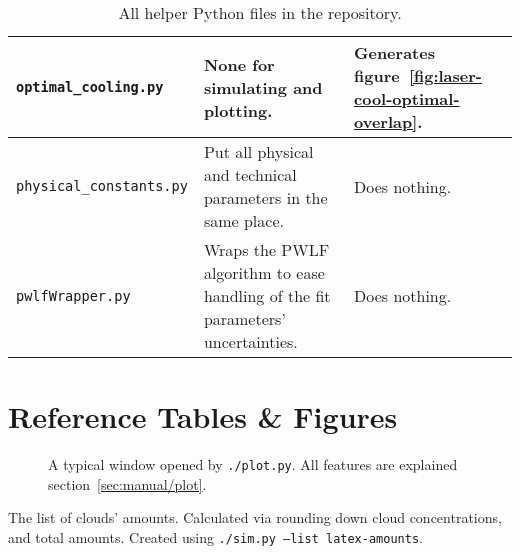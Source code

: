 \begin{sidewaystable}[h]
\begin{tabularx}{\textwidth}{l|X|X}
\hline
\texttt{optimal\_cooling.py}    & None for simulating and plotting.                                                                                                                      & Generates figure~\ref{fig:laser-cool-optimal-overlap}.                                                                                                                                                                                              \\
\hline
\texttt{physical\_constants.py} & Put all physical and technical parameters in the same place.                                                                                           & Does nothing.                                                                                                                                                                                                                                        \\
\hline
\texttt{pwlfWrapper.py}         & Wraps the PWLF algorithm to ease handling of the fit parameters' uncertainties.                                                                        & Does nothing.
\end{tabularx}
\caption{All helper Python files in the repository.}
\label{tbl:helper-scripts}
\end{sidewaystable}

\clearpage
\section{Reference Tables \& Figures}



\begin{sidewaysfigure}[h]
	\begin{center}
	\end{center}
	\caption{A typical window opened by \texttt{./plot.py}. All features are explained section~\ref{sec:manual/plot}.}
	\label{fig:software-plot-example}
\end{sidewaysfigure}

\begin{sidewaystable}[h]

\caption{The list of clouds' amounts. Calculated via rounding down cloud concentrations, and total amounts. Created using \texttt{./sim.py --list latex-amounts}.}
\label{tbl:sim-list-amounts}
\end{sidewaystable}
\restoregeometry
